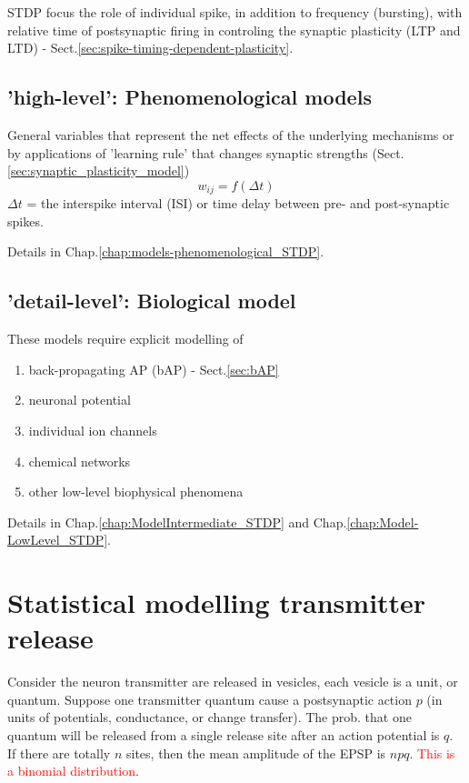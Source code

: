 STDP focus the role of individual spike, in addition to frequency (bursting), 
with relative time of postsynaptic firing in controling the synaptic plasticity
(LTP and LTD) - Sect.\ref{sec:spike-timing-dependent-plasticity}.


\subsection{'high-level': Phenomenological models}

General variables that represent the net effects of the underlying mechanisms
or by applications of 'learning rule' that changes synaptic strengths
(Sect.\ref{sec:synaptic_plasticity_model})
\begin{equation}
w_{ij} = f(\Delta t)
\end{equation}
$\Delta t$ = the interspike interval (ISI) or time delay between pre- and
post-synaptic spikes.

Details in Chap.\ref{chap:models-phenomenological_STDP}.


\subsection{'detail-level': Biological model}

These models require explicit modelling of 
\begin{enumerate}
  \item back-propagating AP (bAP) - Sect.\ref{sec:bAP}
  
  \item neuronal potential
  
  \item individual ion channels
  
  \item chemical networks
  
  \item other low-level biophysical phenomena
\end{enumerate}


Details in Chap.\ref{chap:ModelIntermediate_STDP} and
Chap.\ref{chap:Model-LowLevel_STDP}.




\section{Statistical modelling transmitter release}
\label{sec:stat-modell-transm}

Consider the neuron transmitter are released in vesicles, each vesicle
is a unit, or quantum.  Suppose one transmitter quantum cause a
postsynaptic action $p$ (in units of potentials, conductance, or
change transfer).  The prob. that one quantum will be released from a
single release site after an action potential is $q$. If there are
totally $n$ sites, then the mean amplitude of the EPSP is $npq$.
\textcolor{red}{This is a binomial distribution}.

